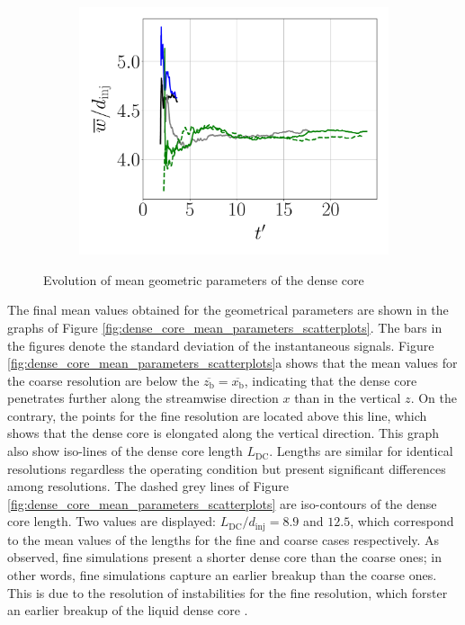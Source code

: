 \begin{figure}[ht]
\hfill
\begin{subfigure}[b]{0.3\textwidth}
	\flushleft
   \includegraphics[scale=0.225]{./part2_developments/figures_ch5_resolved_JICF/results_dense_core_modeling/convergence_mean_width}
\end{subfigure}
   \caption{Evolution of mean geometric parameters of the dense core}
\label{fig:dense_core_mean_parameters_convergence}
\end{figure}

The final mean values obtained for the geometrical parameters are shown in the graphs of Figure \ref{fig:dense_core_mean_parameters_scatterplots}. The bars in the figures denote the standard deviation of the instantaneous signals. Figure \ref{fig:dense_core_mean_parameters_scatterplots}a shows that the mean values for the coarse resolution are below the $\overline{z_\mathrm{b}} = \overline{x_\mathrm{b}}$, indicating that the dense core penetrates further along the streamwise direction $x$ than in the vertical $z$. On the contrary, the points for the fine resolution are located above this line, which shows that the dense core is elongated along the vertical direction. This graph also show iso-lines of the dense core length $L_\mathrm{DC}$. Lengths are similar for identical resolutions regardless the operating condition but present significant differences among resolutions. The dashed grey lines of Figure \ref{fig:dense_core_mean_parameters_scatterplots} are iso-contours of the dense core length.  Two values are displayed: $L_\mathrm{DC}/d_\mathrm{inj} = 8.9$ and $12.5$, which correspond to the mean values of the lengths for the fine and coarse cases respectively. As observed, fine simulations present a shorter dense core than the coarse ones; in other words, fine simulations capture an earlier breakup than the coarse ones. This is due to the resolution of instabilities for the fine resolution, which forster an earlier breakup of the liquid dense core .

